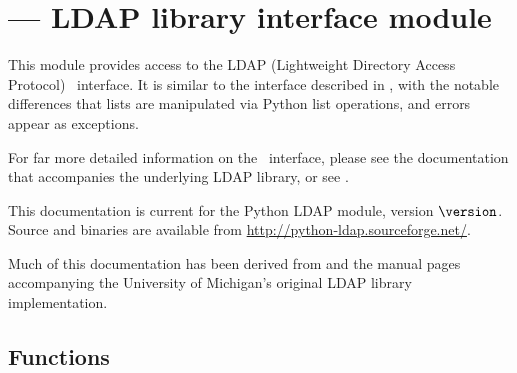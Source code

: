 

\section{ ---
         LDAP library interface module}







This module provides access to the LDAP
(Lightweight Directory Access Protocol) \C\ interface. 
It is similar to the interface described in ,
with the notable differences that lists are manipulated via Python
list operations, and errors appear as exceptions.

For far more detailed information on the \C\ interface, 
please see the documentation that accompanies the underlying
LDAP \C library, or see .

This documentation is current for the Python LDAP module, version
$\version$.
Source and binaries are available from
\url{http://python-ldap.sourceforge.net/}.

Much of this documentation has been derived from  and
the manual pages accompanying the University of Michigan's original
LDAP library implementation.


\subsection{Functions}

